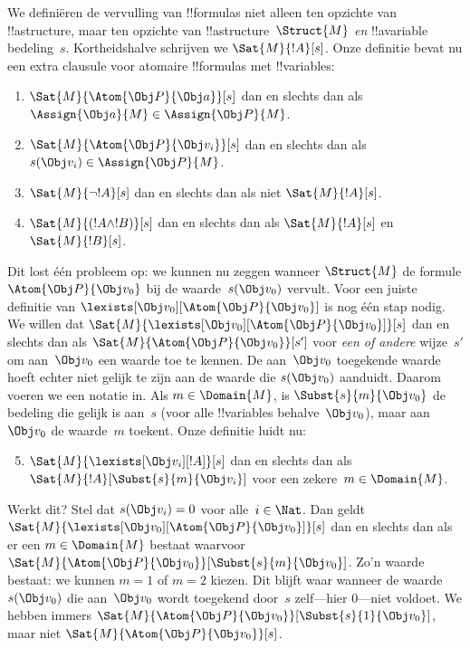 \documentclass[openany]{memoir}
\begin{document}
We definiëren de vervulling van !!{formula}s niet alleen ten opzichte
van !!a{structure}, maar ten opzichte van !!a{structure}~$\Struct{M}$
\emph{en} !!a{variable} bedeling~$s$. Kortheidshalve schrijven we
$\Sat{M}{!A}[s]$. Onze definitie bevat nu een extra clausule voor
atomaire !!{formula}s met !!{variable}s:
\begin{enumerate}
  \item $\Sat{M}{\Atom{\Obj P}{\Obj a}}[s]$ dan en slechts dan als
  $\Assign{\Obj a}{M} \in \Assign{\Obj P}{M}$.
  \item $\Sat{M}{\Atom{\Obj P}{\Obj v_i}}[s]$ dan en slechts dan als
  $s(\Obj v_i) \in \Assign{\Obj P}{M}$.
  \item $\Sat{M}{\lnot !A}[s]$ dan en slechts dan als niet $\Sat{M}{!A}[s]$.
  \item $\Sat{M}{(!A \land !B)}[s]$ dan en slechts dan als $\Sat{M}{!A}[s]$ en $\Sat{M}{!B}[s]$.
\end{enumerate}
Dit lost één probleem op: we kunnen nu zeggen wanneer $\Struct{M}$ de
formule $\Atom{\Obj P}{\Obj v_0}$ bij de waarde~$s(\Obj v_0)$ vervult.
Voor een juiste definitie van $\lexists[\Obj v_0][\Atom{\Obj P}{\Obj
v_0}]$ is nog één stap nodig. We willen dat
$\Sat{M}{\lexists[\Obj v_0][\Atom{\Obj P}{\Obj v_0}]}[s]$ dan en slechts
dan als $\Sat{M}{\Atom{\Obj P}{\Obj v_0}}[s']$ voor \emph{een of andere}
wijze~$s'$ om aan~$\Obj v_0$ een waarde toe te kennen. De aan~$\Obj v_0$
toegekende waarde hoeft echter niet gelijk te zijn aan de waarde die
$s(\Obj v_0)$ aanduidt.
Daarom voeren we een notatie in. Als $m \in \Domain{M}$, is
$\Subst{s}{m}{\Obj v_0}$ de bedeling die gelijk is aan~$s$ (voor alle
!!{variable}s behalve~$\Obj v_0$), maar aan $\Obj v_0$ de waarde~$m$
toekent. Onze definitie luidt nu:
\begin{enumerate}\setcounter{enumi}{4}
  \item $\Sat{M}{\lexists[\Obj v_i][!A]}[s]$ dan en slechts dan als
  $\Sat{M}{!A}[\Subst{s}{m}{\Obj v_i}]$ voor een zekere~$m \in \Domain{M}$.
\end{enumerate}
Werkt dit? Stel dat $s(\Obj v_i) = 0$ voor alle~$i \in \Nat$. Dan
geldt $\Sat{M}{\lexists[\Obj v_0][\Atom{\Obj P}{\Obj v_0}]}[s]$ dan en
slechts dan als er een $m \in \Domain{M}$ bestaat waarvoor
$\Sat{M}{\Atom{\Obj P}{\Obj v_0}}[\Subst{s}{m}{\Obj v_0}]$. Zo'n waarde
bestaat: we kunnen $m = 1$ of $m = 2$ kiezen. Dit blijft waar wanneer
de waarde~$s(\Obj v_0)$ die aan~$\Obj v_0$ wordt toegekend door~$s$
zelf---hier $0$---niet voldoet. We hebben immers
$\Sat{M}{\Atom{\Obj P}{\Obj v_0}}[\Subst{s}{1}{\Obj v_0}]$, maar niet
$\Sat{M}{\Atom{\Obj P}{\Obj v_0}}[s]$.
\end{document}
